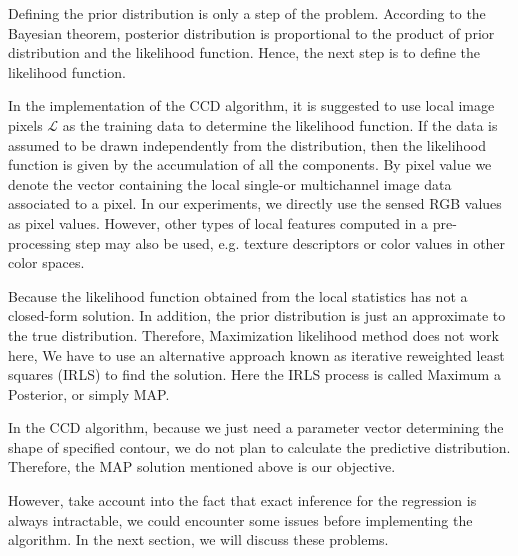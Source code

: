 Defining the prior distribution is only a step of the problem.
According to the Bayesian theorem, posterior distribution
is proportional to the product of prior distribution and the likelihood
function. Hence, the next step is to define the likelihood function.

In the implementation of the CCD algorithm, it is suggested to use
local image pixels $\mathcal{L}$ as the training data to determine the
likelihood function. If the data is assumed to be drawn  independently
from the distribution, then the likelihood function is given by the accumulation of all the components.
By pixel value we denote the vector containing the local single-or multichannel
image data associated to a pixel. In our experiments, we directly use the sensed RGB
values as pixel values. However, other types of local features computed in a pre-processing
step may also be used, e.g. texture descriptors or color values in
other color spaces.

Because the likelihood function obtained from the local statistics has
not a closed-form solution. In addition, the prior distribution is just
an approximate to the true distribution. Therefore, Maximization
likelihood method does not work here, We have to use an alternative
approach known as iterative reweighted least squares (IRLS) to find
the solution. Here the IRLS process is called Maximum a Posterior, or
simply MAP.

In the CCD algorithm, because we just need a parameter vector determining
the shape of specified contour, we do not plan to calculate the
predictive distribution. Therefore, the MAP solution mentioned above
is our objective.

However, take account into the fact that exact inference for the
regression is always intractable, we could encounter some issues before
implementing the algorithm. In the next section, we will discuss these
problems.


